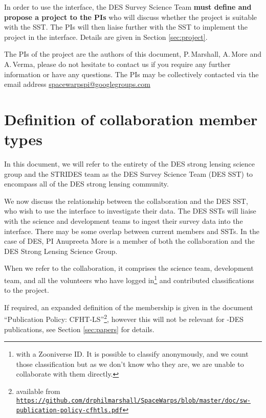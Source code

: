 \documentclass[a4paper,twocolumn]{article}
\begin{document}
In order to use the \SW interface, the DES Survey Science Team \textbf{must define and propose a project to the \SW PIs} who will discuss whether the project is suitable with the SST. The \SW PIs will then liaise further with the SST to implement the project in the \SW interface. Details are given in Section \ref{sec:project}.

\vspace{4mm}
The PIs of the \SW project are the authors of this document, P.\,Marshall, 
A.\,More and A.\,Verma, please do not hesitate to contact us if you require any further information or have any questions. The PIs may be collectively contacted via the email address \href{mailto:spacewarpspi@googlegroups.com}{spacewarpspi@googlegroups.com}




\section{Definition of collaboration member types}
\label{sec:members}

In this document, we will refer to the entirety of the DES strong lensing science group and the STRIDES team as the DES Survey Science Team (DES SST) to encompass all of the DES strong lensing community.

We now discuss the relationship between the \SW collaboration and the DES SST, who wish to use the \SW interface to investigate their data. The DES SSTs will liaise with the \SW science and development teams to ingest their survey data into the \SW interface. There may be some overlap between current \SW members and SSTs. In the case of DES, \SW PI Anupreeta More is a member of both the \SW collaboration and the DES Strong Lensing Science Group.

When we refer to the \SW collaboration, it comprises the \SW science team, \SW development team, and all the volunteers who have 
logged in\footnote{with a Zooniverse ID. It is possible to classify anonymously, and we count those classification but as we don't know who they are, we are unable to collaborate with them directly.} and contributed classifications to the project. 

If required, an expanded definition of the \SW membership is given in the document ``\SW Publication Policy: CFHT-LS''\footnote{available from \texttt{\url{https://github.com/drphilmarshall/SpaceWarps/blob/master/doc/sw-publication-policy-cfhtls.pdf}}}, however this will not be relevant for \SW-DES publications, see Section \ref{sec:papers} for details.
\end{document}
